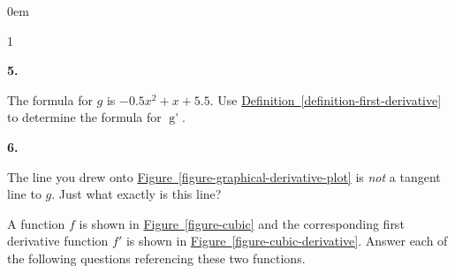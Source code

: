 \documentclass[12pt,]{book}
\theoremstyle{plain}
\theoremstyle{definition}
\numberwithin{equation}{section}
\newcounter{figstack}
\newcounter{figindex}
\newlength\fight
\newcommand\pushValignCaptionBottom[5][b]{%
\stepcounter{figstack}%
\expandafter\def\csname %
figalign\romannumeral\value{figstack}\endcsname{#1}%
\expandafter\def\csname %
figtype\romannumeral\value{figstack}\endcsname{#2}%
\expandafter\def\csname %
figwd\romannumeral\value{figstack}\endcsname{#3}%
\expandafter\def\csname %
figcontent\romannumeral\value{figstack}\endcsname{#4}%
\expandafter\def\csname %
figcap\romannumeral\value{figstack}\endcsname{#5}%
\setbox0=\hbox{%
\begin{#2}{#3}#4\end{#2}}%
\ifdim\dimexpr\ht0+\dp0\relax>\fight\global\setlength{\fight}{%
\dimexpr\ht0+\dp0\relax}\fi%
}
\newcommand\popValignCaptionBottom{%
\setcounter{figindex}{0}%
\hfill%
\whiledo{\value{figindex}<\value{figstack}}{%
\stepcounter{figindex}%
\def\tmp{\csname figwd\romannumeral\value{figindex}\endcsname}%
\begin{\csname figtype\romannumeral\value{figindex}\endcsname}[t]{\tmp}%
\centering%
\stackinset{c}{}%
{\csname figalign\romannumeral\value{figindex}\endcsname}{}%
{\csname figcontent\romannumeral\value{figindex}\endcsname}%
{\rule{0pt}{\fight}}\par%
\csname figcap\romannumeral\value{figindex}\endcsname%
\end{\csname figtype\romannumeral\value{figindex}\endcsname}%
\hfill%
}%
\setcounter{figstack}{0}%
\setlength{\fight}{0pt}%
\hfill%
}
\newenvironment{exercisegroup}%
{\medskip\noindent}%
{\par\bigskip}%
\newlength{\exercisegroupindent}%
\newlength{\exercisegroupitemwidth}%
\newenvironment{exercisegrouplist}%
{\vspace{-\partopsep}%
\begin{adjustwidth}{\exercisegroupindent}{0em}}%
{\end{adjustwidth}%
\vspace{-\partopsep}%
\vspace{\baselineskip}}%
\newenvironment{exercisegroupbycol}[1]%
{\begin{exercisegrouplist}%
\vspace{-\multicolsep}%
\begin{multicols}{#1}%
\setlength{\parindent}{0em}%
\setlength{\exercisegroupitemwidth}{\linewidth}}%
{\end{multicols}%
\vspace{-\multicolsep}%
\end{exercisegrouplist}}%
\newenvironment{exercisegroupitem}[1]%
{\begin{minipage}[t]{\exercisegroupitemwidth}
\vspace{0pt}%
{\bfseries#1}%
\rule{0pt}{\baselineskip}}{\strut%
\end{minipage}%
\hspace{\columnsep}}%
\providecommand\phantomsection{}
\newcommand{\fe}[2]{\mathop{{#1}{\left(#2\right)}}}
\newcommand{\fd}[1]{#1'}
\begin{document}
\begin{exercisegroup}
\begin{exercisegroupbycol}{1}
\begin{exercisegroupitem}{5. }
The formula for \(g\) is \(-0.5x^2+x+5.5\). Use \hyperref[definition-first-derivative]{Definition~\ref*{definition-first-derivative}} to determine the formula for \(\fe{\fd{g}}{x}\).%
\end{exercisegroupitem}%
\par%
\begin{exercisegroupitem}{6. }\phantomsection\hypertarget{exercise-215}{\null}
The line you drew onto \hyperref[figure-graphical-derivative-plot]{Figure~\ref*{figure-graphical-derivative-plot}} is \emph{not} a tangent line to \(g\). Just what exactly is this line?%
\end{exercisegroupitem}%
\par%
\end{exercisegroupbycol}%
\end{exercisegroup}%
\begin{exercisegroup}%
A function \(f\) is shown in \hyperref[figure-cubic]{Figure~\ref*{figure-cubic}} and the corresponding first derivative function \(\fd{f}\) is shown in \hyperref[figure-cubic-derivative]{Figure~\ref*{figure-cubic-derivative}}. Answer each of the following questions referencing these two functions.%

\end{exercisegroup}
\end{document}
